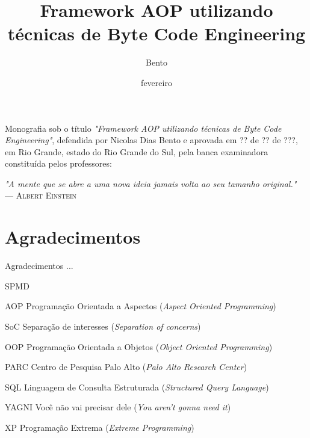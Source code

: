 \documentclass[tc,openright]{iiufrgs}
\title{Framework AOP utilizando técnicas de Byte Code Engineering}
\author{Bento}{Nicolas}
\date{fevereiro}{2014}
\begin{document}
\maketitle

\begin{folhadeaprovacao}
Monografia sob o título \textit{"Framework AOP utilizando técnicas de Byte Code Engineering"}, defendida por Nicolas Dias Bento e aprovada em ?? de ?? de ???, em Rio Grande, estado do Rio Grande do Sul, pela banca examinadora constituída pelos professores:
\end{folhadeaprovacao}

\clearpage

\begin{flushright}
\mbox{}\vfill
{\sffamily\itshape
"A mente que se abre a uma nova ideia jamais volta ao seu tamanho original."\\}
--- \textsc{Albert Einstein}
\end{flushright}

\chapter*{Agradecimentos}

Agradecimentos ...

\tableofcontents

\begin{listofabbrv}{SPMD}
	\item[AOP] Programação Orientada a Aspectos (\textit{Aspect Oriented Programming})
	\item[SoC] Separação de interesses (\textit{Separation of concerns})
	\item[OOP] Programação Orientada a Objetos (\textit{Object Oriented Programming})
	\item[PARC] Centro de Pesquisa Palo Alto (\textit{Palo Alto Research Center})
	\item[SQL]  Linguagem de Consulta Estruturada (\textit{Structured Query Language})
	\item[YAGNI] Você não vai precisar dele (\textit{You aren’t gonna need it})
	\item[XP] Programação Extrema (\textit{Extreme Programming})
\end{listofabbrv}
\end{document}
